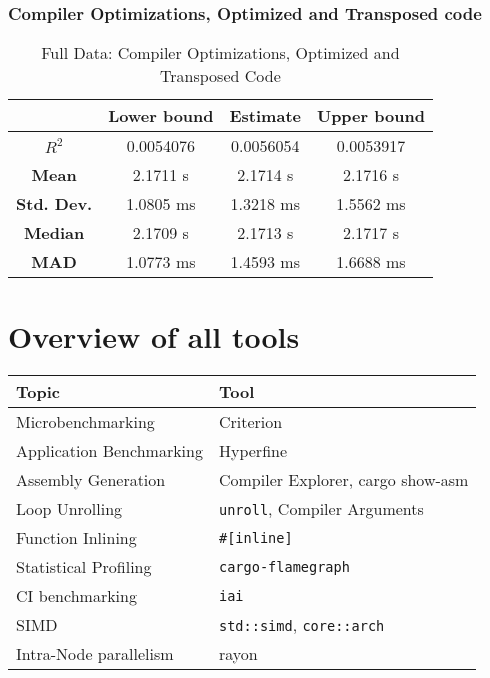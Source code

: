 \subsubsection{Compiler Optimizations, Optimized and Transposed code}
\begin{table}[H]
\centering
\begin{tabular}{|c|c|c|c|}
\hline
\textbf{} & \textbf{Lower bound} & \textbf{Estimate} & \textbf{Upper bound} \\
\hline
\textbf{$R^2$} & 0.0054076 & 0.0056054 & 0.0053917 \\
\hline
\textbf{Mean} & 2.1711 s & 2.1714 s & 2.1716 s \\
\hline
\textbf{Std. Dev.} & 1.0805 ms & 1.3218 ms & 1.5562 ms \\
\hline
\textbf{Median} & 2.1709 s & 2.1713 s & 2.1717 s \\
\hline
\textbf{MAD} & 1.0773 ms & 1.4593 ms & 1.6688 ms \\
\hline
\end{tabular}
\caption{Full Data: Compiler Optimizations, Optimized and Transposed Code}
\end{table}

\section{Overview of all tools}

  \begin{table}[H]
\centering
    \begin{tabular}{|l|l|}
      \hline
      \textbf{Topic} & \textbf{Tool}\\
      \hline
      Microbenchmarking & Criterion\\
      \hline
      Application Benchmarking & Hyperfine\\
      \hline
      Assembly Generation & Compiler Explorer, cargo show-asm\\
      \hline
      Loop Unrolling & \texttt{unroll}, Compiler Arguments\\
      \hline
      Function Inlining & \texttt{\#[inline]} \\
      \hline
      Statistical Profiling & \texttt{cargo-flamegraph} \\
      \hline
      CI benchmarking & \texttt{iai} \\
      \hline
      SIMD & \texttt{std::simd}, \texttt{core::arch} \\
      \hline
      Intra-Node parallelism & rayon \\
      \hline
    \end{tabular}
  \end{table}

